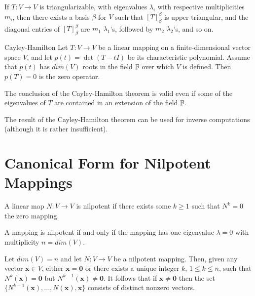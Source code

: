 \documentclass[12pt]{report}
\newcommand{\mb}[1]{\mathbf{#1}}
\begin{document}
\begin{cor}{}{}
    If $T:V\rightarrow V$ is triangularizable, with eigenvalues $\lambda_i$ with respective multiplicities $m_i$, then there exists a basis $\beta$ for $V$ such that $[T]_{\beta}^{\beta}$ is upper triangular, and the diagonal entries of $[T]_{\beta}^{\beta}$ are $m_1$ $\lambda_1$'s, followed by $m_2$ $\lambda_2$'s, and so on.
\end{cor}

\begin{thm}{Cayley-Hamilton}{}
    Let $T:V\rightarrow V$ be a linear mapping on a finite-dimensional vector space $V$, and let $p(t) = \det(T- tI)$ be its characteristic polynomial. Assume that $p(t)$ has $dim(V)$ roots in the field $\mathbb F$ over which $V$ is defined. Then $p(T) =0$ is the zero operator.
\end{thm}


\begin{rmk}{}{}
    The conclusion of the Cayley-Hamilton theorem is valid even if some of the eigenvalues of $T$ are contained in an extension of the field $\mathbb F$.
\end{rmk}

\begin{rmk}{}{}
    The result of the Cayley-Hamilton theorem can be used for inverse computations (although it is rather insufficient).
\end{rmk}

\section{Canonical Form for Nilpotent Mappings}

\begin{defn}{}{}
    A linear map $N:V\rightarrow V$ is nilpotent if there exists some $k \geq 1$ such that $N^k = 0$ the zero mapping.
\end{defn}


\begin{lem}{}{}
    A mapping is nilpotent if and only if the mapping has one eigenvalue $\lambda = 0$ with multiplicity $n = dim(V)$.
\end{lem}

\begin{rmk}{}{}
    Let $dim(V) = n$ and let $N:V\rightarrow V$ be a nilpotent mapping. Then, given any vector $\mb x \in V$, either $\mb x = \mb 0$ or there exists a unique integer $k$, $1 \leq k \leq n$, such that $N^k(\mb x) = \mb 0$ but $N^{k-1}(\mb x) \neq \mb 0$. It follows that if $\mb x \neq \mb 0$ then the set $\{N^{k-1}(\mb x),...,N(\mb x), \mb x\}$ consists of distinct nonzero vectors.
\end{rmk}
\end{document}
